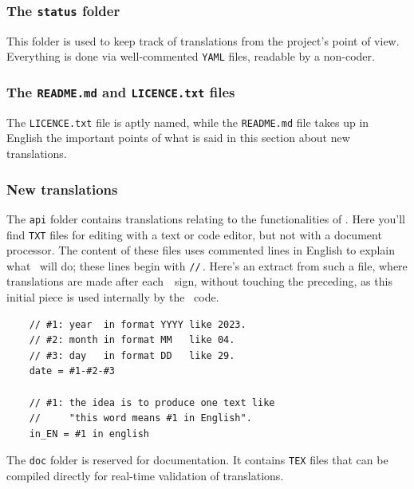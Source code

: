 \documentclass{tutodoc}
\begin{document}
\subsubsection{The \texttt{status} folder}

This folder is used to keep track of translations from the project's point of view. Everything is done via well-commented \verb#YAML# files, readable by a non-coder.


\subsubsection{The \texttt{README.md} and \texttt{LICENCE.txt} files}

The \texttt{LICENCE.txt} file is aptly named, while the \texttt{README.md} file takes up in English the important points of what is said in this section about new translations.


\subsubsection{New translations}
\label{tutodoc-contrib-translate}

\begin{tdocimp}
    The \verb#api# folder contains translations relating to the functionalities of \thisproj.
    Here you'll find \verb#TXT# files for editing with a text or code editor, but not with a document processor.
    The content of these files uses commented lines in English to explain what \thisproj\ will do; these lines begin with \verb#//#\,. Here's an extract from such a file, where translations are made after each \,\fbox{$=$\vphantom{pM}}\ sign, without touching the preceding, as this initial piece is used internally by the \thisproj\ code.

    \tdocsep
    \vspace{-10pt}
    \begin{verbatim}
    // #1: year  in format YYYY like 2023.
    // #2: month in format MM   like 04.
    // #3: day   in format DD   like 29.
    date = #1-#2-#3

    // #1: the idea is to produce one text like
    //     "this word means #1 in English".
    in_EN = #1 in english\end{verbatim}
\end{tdocimp}


\begin{tdocnote}
    The \verb#doc# folder is reserved for documentation. It contains \verb#TEX# files that can be compiled directly for real-time validation of translations.
\end{tdocnote}
\end{document}
